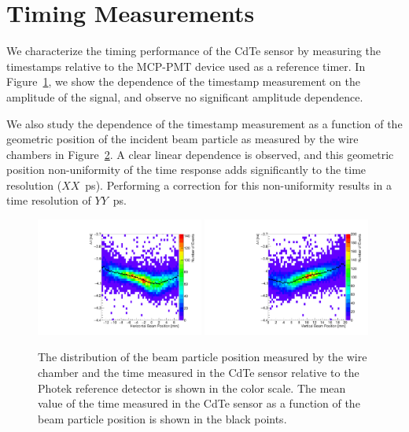 
\section{Timing Measurements} 
\label{sec:timing} 

We characterize the timing performance of the CdTe sensor by measuring the timestamps
relative to the MCP-PMT device used as a reference timer. In 
Figure~\ref{fig:DeltaTVsAmplitude}, we show the dependence of the timestamp measurement 
on the amplitude of the signal, and observe no significant amplitude dependence.



\begin{figure}[htbp] 
\centering
\caption{  } 
\label{fig:DeltaTVsAmplitude} 
\end{figure} 


We also study the dependence of the timestamp measurement as a function of the geometric
position of the incident beam particle as measured by the wire chambers in 
Figure~\ref{fig:DeltaTVsBeamXY}. A clear linear dependence is observed, and this 
geometric position non-uniformity of the time response adds significantly to the 
time resolution ($XX$~ps). Performing a correction for this non-uniformity results
in a time resolution of $YY$~ps.

\begin{figure}[htbp] 
\centering
\includegraphics[width=0.49\textwidth]{figures/DeltaTVsHorizontalPosition.pdf} 
\includegraphics[width=0.49\textwidth]{figures/DeltaTVsVerticalPosition.pdf} 
\caption{ The distribution of the beam particle position measured by the wire chamber
and the time measured in the CdTe sensor relative to the Photek reference detector
is shown in the color scale. The mean value of the time measured in the CdTe sensor as a function
of the beam particle position is shown in the black points.} 
\label{fig:DeltaTVsBeamXY} 
\end{figure} 

